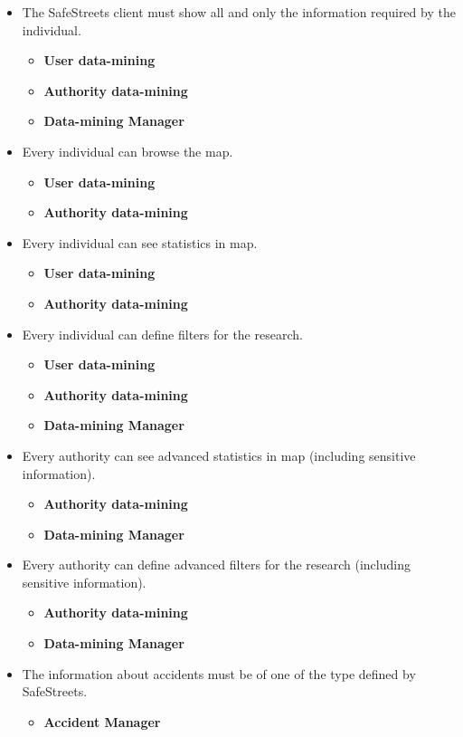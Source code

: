 \documentclass{article}
\newcommand\requirement[1]{\item[{[R#1]}] }
\begin{document}
\begin{itemize}
			\requirement{8} The SafeStreets client must show all and only the information required by the individual.
			\begin{itemize}
				\item \textbf{User data-mining}
				\item \textbf{Authority data-mining}
				\item \textbf{Data-mining Manager}
			\end{itemize}
			\requirement{9} Every individual can browse the map.
			\begin{itemize}
				\item \textbf{User data-mining}
				\item \textbf{Authority data-mining}
			\end{itemize}
			\requirement{10} Every individual can see statistics in map.
			\begin{itemize}
				\item \textbf{User data-mining}
				\item \textbf{Authority data-mining}
			\end{itemize}
			\requirement{11} Every individual can define filters for the research.
			\begin{itemize}
				\item \textbf{User data-mining}
				\item \textbf{Authority data-mining}
				\item \textbf{Data-mining Manager}
			\end{itemize}
			\requirement{12} Every authority can see advanced statistics in map (including sensitive information).
			\begin{itemize}
				\item \textbf{Authority data-mining}
				\item \textbf{Data-mining Manager}
			\end{itemize}
			\requirement{13} Every authority can define advanced filters for the research (including sensitive information).
			\begin{itemize}
				\item \textbf{Authority data-mining}
				\item \textbf{Data-mining Manager}
			\end{itemize}
			\requirement{14} The information about accidents must be of one of the type defined by SafeStreets.
			\begin{itemize}
				\item \textbf{Accident Manager}
			\end{itemize}

\end{itemize}
\end{document}
